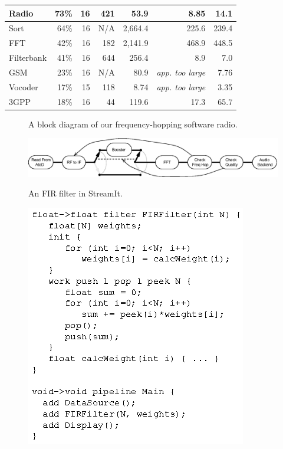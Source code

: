 \documentclass[final]{ijpp}
\begin{document}
\begin{table}
\begin{tabular}{l||r|r|r|r||r||r}
Radio  & 73\% & 16 & 421 &    53.9  & 8.85 & 14.1 \\ \hline
Sort   & 64\% & 16  & N/A &  2,664.4 & 225.6 & 239.4 \\ \hline
FFT    & 42\% & 16  & 182 &  2,141.9 & 468.9 & 448.5  \\ \hline
Filterbank & 
       41\% & 16  &  644 &   256.4  & 8.9 & 7.0   \\ \hline
GSM    & 23\% & 16 & N/A &    80.9  & {\it app. too large} & 7.76 \\ \hline
Vocoder& 17\% & 15  & 118 &     8.74  & {\it app. too large} & 3.35  \\ \hline
3GPP   & 18\% & 16  & 44 &   119.6  & 17.3  & 65.7   \\ \hline
\end{tabular}
\end{table}
\clearpage


\clearpage
\begin{figure}
  \caption{A block diagram of our frequency-hopping software radio.}
  \label{fig:radiodiagram}
\end{figure}
\clearpage
\begin{figure}
  \includegraphics[width=\columnwidth]{Radio.eps}
\end{figure}

\clearpage
\begin{figure}
  \caption{An FIR filter in StreamIt.}
  \label{fig:firstreamit}
\end{figure}
\clearpage
\begin{figure}
  \includegraphics{fir-streamit.eps}
\end{figure}
\end{document}
